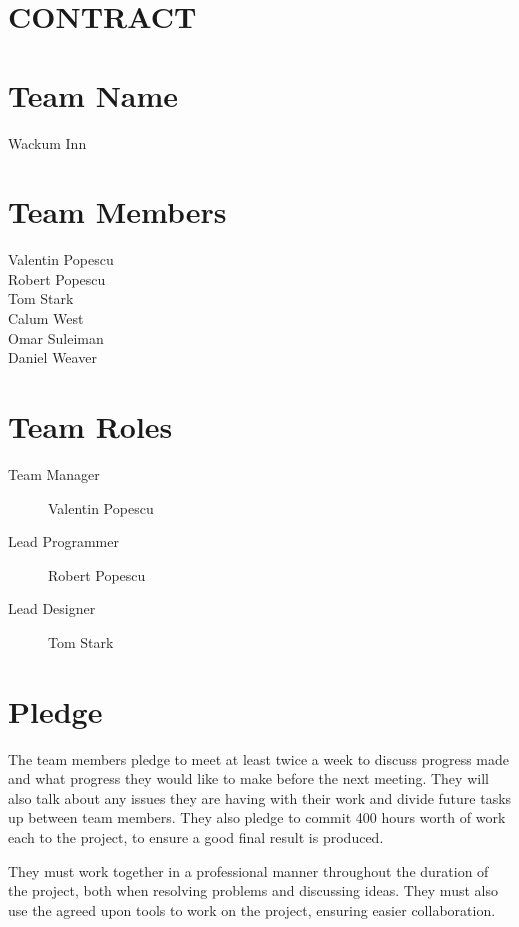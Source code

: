 \documentclass{article} %
\begin{document}
\large
\fi
\section*{\centering\LARGE CONTRACT}
\section*{Team Name}
Wackum Inn
\section*{Team Members}
Valentin Popescu\\
Robert Popescu\\
Tom Stark\\
Calum West\\
Omar Suleiman\\
Daniel Weaver
\section*{Team Roles}
\begin{description}
    \item[Team Manager] Valentin Popescu
    \item[Lead Programmer] Robert Popescu
    \item[Lead Designer] Tom Stark
\end{description}
\section*{Pledge}
The team members pledge to meet at least twice a week to discuss progress made and what progress they would like to make before the next meeting. They will also talk about any issues they are having with their work and divide future tasks up between team members. They also pledge to commit 400 hours worth of work each to the project, to ensure a good final result is produced.

They must work together in a professional manner throughout the duration of the project, both when resolving problems and discussing ideas. They must also use the agreed upon tools to work on the project, ensuring easier collaboration.
\vspace{\fill}
\end{document}
